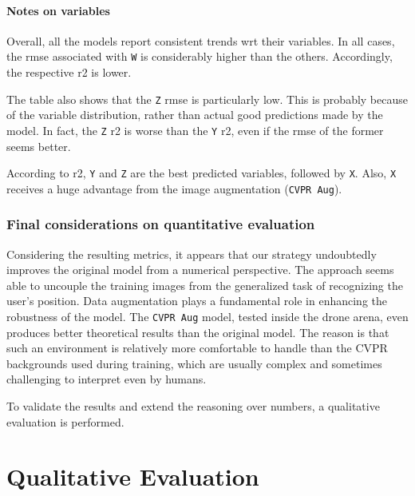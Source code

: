 \paragraph*{Notes on variables}

Overall, all the models report consistent trends \gls{wrt} their variables. In all cases, the \gls{rmse} associated with \texttt{W} is considerably higher than the others. Accordingly, the respective \gls{r2} is lower. 

The table also shows that the \texttt{Z} \gls{rmse} is particularly low. This is probably because of the variable distribution, rather than actual good predictions made by the model. In fact, the \texttt{Z} \gls{r2} is worse than the \texttt{Y} \gls{r2}, even if the \gls{rmse} of the former seems better.

According to \gls{r2}, \texttt{Y} and \texttt{Z} are the best predicted variables, followed by \texttt{X}. Also, \texttt{X} receives a huge advantage from the image augmentation (\texttt{CVPR Aug}). 





\subsubsection*{Final considerations on quantitative evaluation}

Considering the resulting metrics, it appears that our strategy undoubtedly improves the original model from a numerical perspective. The approach seems able to uncouple the training images from the generalized task of recognizing the user's position. Data augmentation plays a fundamental role in enhancing the robustness of the model. The \texttt{CVPR Aug} model, tested inside the drone arena, even produces better theoretical results than the original model. The reason is that such an environment is relatively more comfortable to handle than the CVPR backgrounds used during training, which are usually complex and sometimes challenging to interpret even by humans.

To validate the results and extend the reasoning over numbers, a qualitative evaluation is performed.



\section{Qualitative Evaluation}
\label{sec:evaluation-qualitative}


